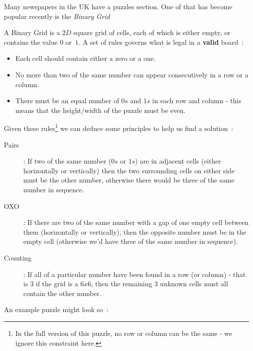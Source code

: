 Many newspapers in the UK have a puzzles section.
One of that has become popular recently is the {\em Binary Grid}

A Binary Grid is a $2D$ square grid of cells, each of which is either empty, or contains the value $0$ or~$1$.
A set of rules governs what is legal in a {\bf valid} board~:
\begin{itemize}
\item Each cell should contain either a zero or a one.
\item No more than two of the same number can appear consecutively in a row or a column.
\item There must be an equal number of $0s$ and $1s$ in each row and column - this means that the height/width of the
puzzle must be even.
\end{itemize}

\noindent Given these rules\footnote{In
the full version of this puzzle, no row or column can be the same - we ignore this constraint here.}
we can deduce some principles to help us find a solution~:\\
\begin{description}
\item[Pairs] : If two of the same number ($0s$ or $1s$) are in adjacent cells (either horizontally or vertically) then the two surrounding
cells on either side must be the other number, otherwise there would be three of the same number in sequence.
\item[OXO] : If there are two of the same number with a gap of one empty cell between them (horizontally or vertically),
then the opposite number must be in the empty cell (otherwise we'd have three of the same number in sequence).
\item[Counting] : If all of a particular number have been found in a row (or column) - that is $3$ if the grid is a $6x6$, then the remaining $3$ unknown cells must all contain the other number.
\end{description}

\noindent An example puzzle might look so~:\\
\begin{center}
\end{center}

